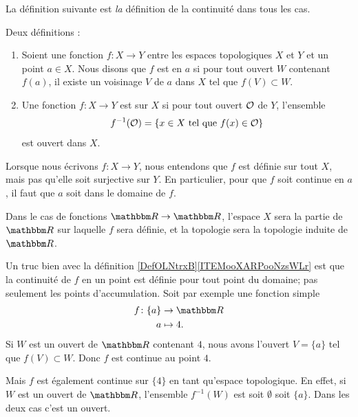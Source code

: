 La définition suivante est \emph{la} définition de la continuité dans tous les cas.
\begin{definition}\label{DefOLNtrxB}
    Deux définitions :
    \begin{enumerate}
        \item   \label{ITEMooXARPooNzsWLr}
            Soient une fonction \( f\colon X\to Y\) entre les espaces topologiques \( X\) et \( Y\) et un point \( a\in X\). Nous disons que \( f\) est  en \( a\) si pour tout ouvert \( W\) contenant \( f(a)\), il existe un voisinage \( V\) de \( a\) dans \( X\) tel que \( f(V)\subset W\).
        \item       \label{ITEMooEHGWooDdITRV}
    Une fonction \( f\colon X\to Y\) est  sur \( X\) si pour tout ouvert \( \mathcal{O}\) de \( Y\), l'ensemble
    \begin{equation}      \label{defFminus1ofaset}
      f^{-1}(\mathcal{O}) = \{ x \in X \text{ tel que } f(x) \in \mathcal{O}\}
    \end{equation}
est ouvert dans \( X\).
    \end{enumerate}
\end{definition}

\begin{normaltext}
    Lorsque nous écrivons \( f\colon X\to Y\), nous entendons que \( f\) est définie sur tout \( X\), mais pas qu'elle soit surjective sur \( Y\). En particulier, pour que \( f\) soit continue en \( a\), il faut que \( a\) soit dans le domaine de \( f\). 

    Dans le cas de fonctions \( \eR\to \eR\), l'espace \( X\) sera la partie de \( \eR\) sur laquelle \( f\) sera définie, et la topologie sera la topologie induite de \( \eR\).
\end{normaltext} 

\begin{example}
    Un truc bien avec la définition \ref{DefOLNtrxB}\ref{ITEMooXARPooNzsWLr} est que la continuité de \( f\) en un point est définie pour tout point du domaine; pas seulement les points d'accumulation. Soit par exemple une fonction simple
    \begin{equation}
        \begin{aligned}
            f\colon \{a\}&\to \eR \\
            a&\mapsto 4. 
        \end{aligned}
    \end{equation}
    Si \( W\) est un ouvert de \( \eR\) contenant \( 4\), nous avons l'ouvert \( V=\{a\}\) tel que \( f(V)\subset W\). Donc \( f\) est continue au point \( 4\).

    Mais \( f\) est également continue sur \( \{4\}\) en tant qu'espace topologique. En effet, si \( W\) est un ouvert de \( \eR\), l'ensemble \( f^{-1}(W)\) est soit \( \emptyset\) soit \( \{a\}\). Dans les deux cas c'est un ouvert.
\end{example}

